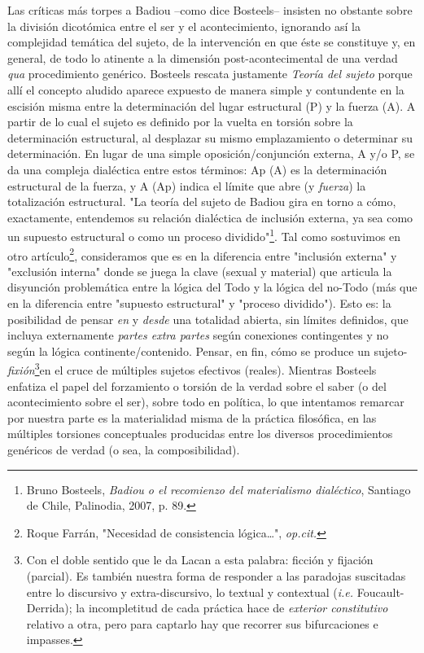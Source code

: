 Las críticas más torpes a Badiou --como dice Bosteels-- insisten no
obstante sobre la división dicotómica entre el ser y el acontecimiento,
ignorando así la complejidad temática del sujeto, de la intervención en
que éste se constituye y, en general, de todo lo atinente a la dimensión
post-acontecimental de una verdad \emph{qua} procedimiento genérico.
Bosteels rescata justamente \emph{Teoría del sujeto} porque allí el
concepto aludido aparece expuesto de manera simple y contundente en la
escisión misma entre la determinación del lugar estructural (P) y la
fuerza (A). A partir de lo cual el sujeto es definido por la vuelta en
torsión sobre la determinación estructural, al desplazar su mismo
emplazamiento o determinar su determinación. En lugar de una simple
oposición/conjunción externa, A y/o P, se da una compleja dialéctica
entre estos términos: Ap (A) es la determinación estructural de la
fuerza, y A (Ap) indica el límite que abre (y \emph{fuerza}) la
totalización estructural. "La teoría del sujeto de Badiou gira en torno
a cómo, exactamente, entendemos su relación dialéctica de inclusión
externa, ya sea como un supuesto estructural o como un proceso
dividido"\footnote{Bruno Bosteels, \emph{Badiou o el recomienzo del
  materialismo dialéctico}, Santiago de Chile, Palinodia, 2007, p. 89.}.
Tal como sostuvimos en otro artículo\footnote{Roque Farrán, "Necesidad
  de consistencia lógica\ldots", \emph{op.cit.}}, consideramos que es en
la diferencia entre "inclusión externa" y "exclusión interna" donde se
juega la clave (sexual y material) que articula la disyunción
problemática entre la lógica del Todo y la lógica del no-Todo (más que
en la diferencia entre "supuesto estructural" y "proceso dividido").
Esto es: la posibilidad de pensar \emph{en} y \emph{desde} una totalidad
abierta, sin límites definidos, que incluya externamente \emph{partes
extra partes} según conexiones contingentes y no según la lógica
continente/contenido. Pensar, en fin, cómo se produce un
sujeto-\emph{fixión}\footnote{Con el doble sentido que le da Lacan a
  esta palabra: ficción y fijación (parcial). Es también nuestra forma
  de responder a las paradojas suscitadas entre lo discursivo y
  extra-discursivo, lo textual y contextual (\emph{i.e.}
  Foucault-Derrida); la incompletitud de cada práctica hace de
  \emph{exterior constitutivo} relativo a otra, pero para captarlo hay
  que recorrer sus bifurcaciones e impasses.}en el cruce de múltiples
sujetos efectivos (reales). Mientras Bosteels enfatiza el papel del
forzamiento o torsión de la verdad sobre el saber (o del acontecimiento
sobre el ser), sobre todo en política, lo que intentamos remarcar por
nuestra parte es la materialidad misma de la práctica filosófica, en las
múltiples torsiones conceptuales producidas entre los diversos
procedimientos genéricos de verdad (o sea, la composibilidad).

